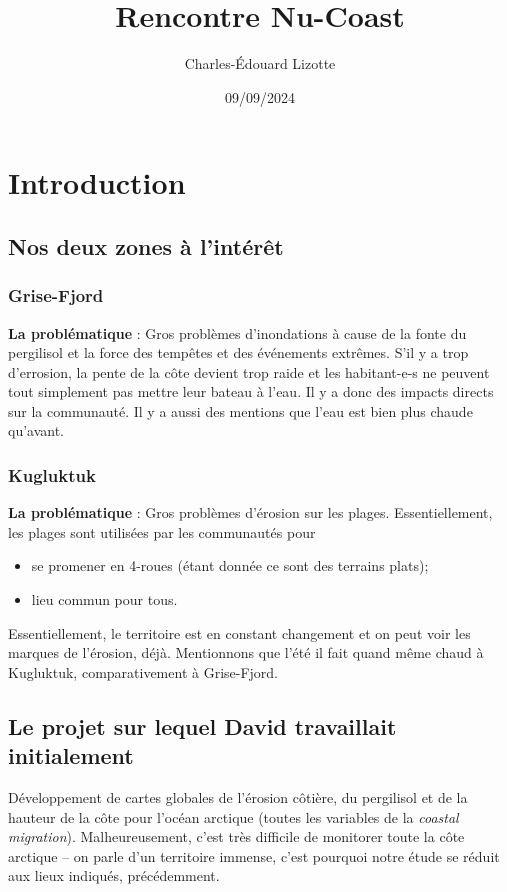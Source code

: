 \documentclass[10pt]{article}
\author{Charles-Édouard Lizotte}
\date{09/09/2024}
\title{Rencontre Nu-Coast}
\numberwithin{equation}{section}
\begin{document}
\maketitle
\tableofcontents

\section{Introduction}
\label{sec:org61d7a34}

\subsection{Nos deux zones à l'intérêt}
\label{sec:orgc219520}

\subsubsection{Grise-Fjord}
\label{sec:org4f44e67}

\textbf{La  problématique} : Gros problèmes d'inondations à cause de la fonte du pergilisol et la force des tempêtes et des événements extrêmes. S'il y a trop d'errosion, la pente de la côte devient trop raide et les habitant-e-s ne peuvent tout simplement pas mettre leur bateau à l'eau. Il y a donc des impacts directs sur la communauté. Il y a aussi des mentions que l'eau est bien plus chaude qu'avant.
\subsubsection{Kugluktuk}
\label{sec:org7cd734d}

\textbf{La problématique} : Gros problèmes d'érosion sur les plages. Essentiellement, les plages sont utilisées par les communautés pour
\begin{itemize}
\item se promener en 4-roues (étant donnée ce sont des terrains plats);
\item lieu commun pour tous.
\end{itemize}
Essentiellement, le territoire est en constant changement et on peut voir les marques de l'érosion, déjà. Mentionnons que l'été il fait quand même chaud à Kugluktuk, comparativement à Grise-Fjord.
\subsection{Le projet sur lequel David travaillait initialement}
\label{sec:orged1cc52}

Développement de cartes globales de l'érosion côtière, du pergilisol et de la hauteur de la côte pour l'océan arctique (toutes les variables de la \emph{coastal migration}). Malheureusement, c'est très difficile de monitorer toute la côte arctique -- on parle d'un territoire immense, c'est pourquoi notre étude se réduit aux lieux indiqués, précédemment. 
\end{document}
